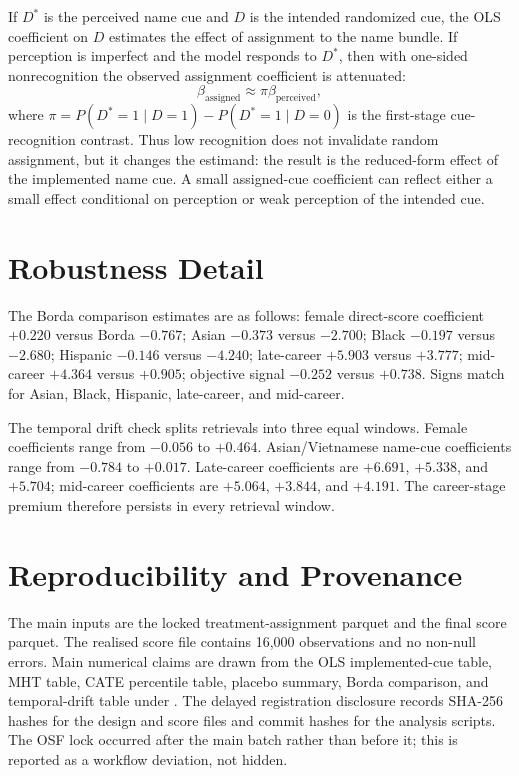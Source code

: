 \documentclass[10pt,twocolumn,letterpaper]{article}
\begin{document}
If $D^\ast$ is the perceived name cue and $D$ is the intended randomized cue, the OLS coefficient on $D$ estimates the effect of assignment to the name bundle. If perception is imperfect and the model responds to $D^\ast$, then with one-sided nonrecognition the observed assignment coefficient is attenuated:
\[
\beta_{\mathrm{assigned}} \approx \pi \beta_{\mathrm{perceived}},
\]
where $\pi=P(D^\ast=1\mid D=1)-P(D^\ast=1\mid D=0)$ is the first-stage cue-recognition contrast. Thus low recognition does not invalidate random assignment, but it changes the estimand: the result is the reduced-form effect of the implemented name cue. A small assigned-cue coefficient can reflect either a small effect conditional on perception or weak perception of the intended cue.

\section{Robustness Detail}
\label{app:robust}

The Borda comparison estimates are as follows: female direct-score coefficient $+0.220$ versus Borda $-0.767$; Asian $-0.373$ versus $-2.700$; Black $-0.197$ versus $-2.680$; Hispanic $-0.146$ versus $-4.240$; late-career $+5.903$ versus $+3.777$; mid-career $+4.364$ versus $+0.905$; objective signal $-0.252$ versus $+0.738$. Signs match for Asian, Black, Hispanic, late-career, and mid-career.

The temporal drift check splits retrievals into three equal windows. Female coefficients range from $-0.056$ to $+0.464$. Asian/Vietnamese name-cue coefficients range from $-0.784$ to $+0.017$. Late-career coefficients are $+6.691$, $+5.338$, and $+5.704$; mid-career coefficients are $+5.064$, $+3.844$, and $+4.191$. The career-stage premium therefore persists in every retrieval window.

\section{Reproducibility and Provenance}
\label{app:provenance}

The main inputs are the locked treatment-assignment parquet and the final score parquet. The realised score file contains 16,000 observations and no non-null errors. Main numerical claims are drawn from the OLS implemented-cue table, MHT table, CATE percentile table, placebo summary, Borda comparison, and temporal-drift table under . The delayed registration disclosure records SHA-256 hashes for the design and score files and commit hashes for the analysis scripts. The OSF lock occurred after the main batch rather than before it; this is reported as a workflow deviation, not hidden.
\end{document}
